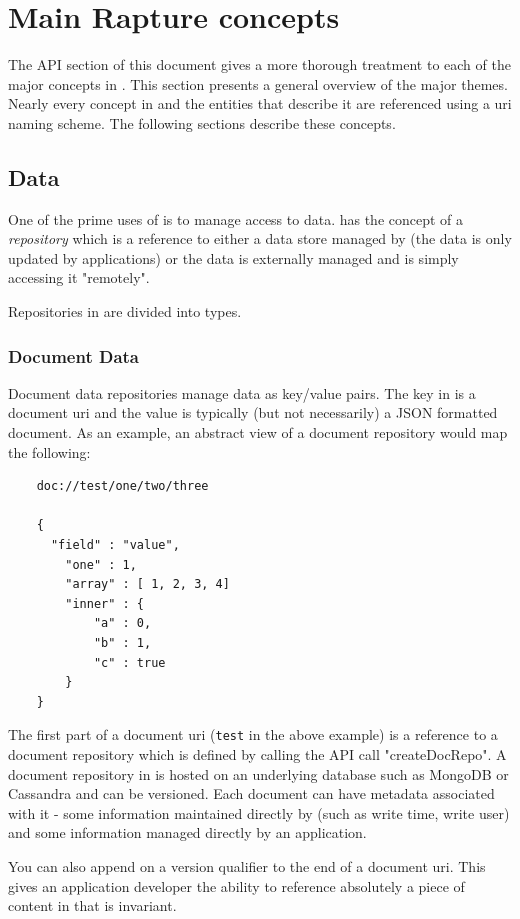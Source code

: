 \chapter{Main Rapture concepts}

The API section of this document gives a more thorough treatment to each of the major concepts in \Rapture. This section
presents a general overview of the major themes. Nearly every concept in \Rapture and the entities that describe it are
referenced using a uri naming scheme. The following sections describe these concepts.

\section{Data}
One of the prime uses of \Rapture is to manage access to data. \Rapture has the concept of a \emph{repository} which is a
reference to either a data store managed by \Rapture (the data is only updated by \Rapture applications) or
the data is externally managed and \Rapture is simply accessing it "remotely".

Repositories in \Rapture are divided into types.

\subsection{Document Data}
Document data repositories manage data as key/value pairs. The key in \Rapture is a document uri and the value
is typically (but not necessarily) a JSON formatted document. As an example, an abstract view of a document repository would map the following:

\begin{Verbatim}
	doc://test/one/two/three

	{
	  "field" : "value",
		"one" : 1,
		"array" : [ 1, 2, 3, 4]
		"inner" : {
			"a" : 0,
			"b" : 1,
			"c" : true
		}
	}
\end{Verbatim}

The first part of a document uri (\Verb+test+ in the above example) is a reference to a
document repository which is defined by calling the \Rapture API call "createDocRepo". A
document repository in \Rapture is hosted on an underlying database such as MongoDB or Cassandra
and can be versioned. Each document can have metadata associated with it - some information maintained
directly by \Rapture (such as write time, write user) and some information managed directly by
an application.

You can also append on a version qualifier to the end of a document uri. This gives an application
developer the ability to reference absolutely a piece of content in \Rapture that is invariant.

